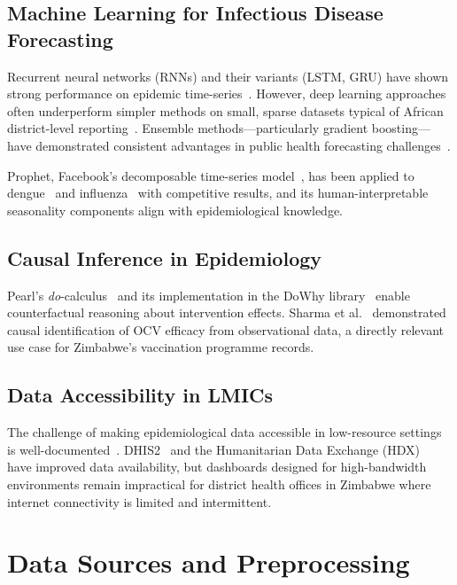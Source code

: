 \documentclass[conference]{IEEEtran}
\begin{document}
\subsection{Machine Learning for Infectious Disease Forecasting}

Recurrent neural networks (RNNs) and their variants (LSTM, GRU) have shown
strong performance on epidemic time-series~\cite{chimmula2020time,
dlinear_2023}. However, deep learning approaches often underperform simpler
methods on small, sparse datasets typical of African district-level
reporting~\cite{reich2022collaborative}. Ensemble methods—particularly gradient
boosting—have demonstrated consistent advantages in public health forecasting
challenges~\cite{ray2020ensemble}.

Prophet, Facebook's decomposable time-series model~\cite{taylor2018forecasting},
has been applied to dengue~\cite{chakraborty2019forecasting} and
influenza~\cite{osthus2021multiscale} with competitive results, and its
human-interpretable seasonality components align with epidemiological knowledge.

\subsection{Causal Inference in Epidemiology}

Pearl's \textit{do}-calculus~\cite{pearl2009causality} and its implementation
in the DoWhy library~\cite{dowhy2019} enable counterfactual reasoning about
intervention effects. Sharma et al.~\cite{sharma2021dowhy} demonstrated causal
identification of OCV efficacy from observational data, a directly relevant
use case for Zimbabwe's vaccination programme records.

\subsection{Data Accessibility in LMICs}

The challenge of making epidemiological data accessible in low-resource settings
is well-documented~\cite{gbd2020data}. DHIS2~\cite{dhis2} and the Humanitarian
Data Exchange (HDX)~\cite{hdx} have improved data availability, but dashboards
designed for high-bandwidth environments remain impractical for district health
offices in Zimbabwe where internet connectivity is limited and intermittent.


\section{Data Sources and Preprocessing}
\label{sec:data}
\end{document}
